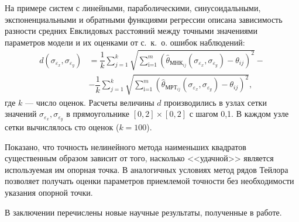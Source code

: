 На примере систем с линейными, параболическими, синусоидальными, экспоненциальными и
обратными функциями регрессии описана зависимость разности
средних Евклидовых расстояний между точными значениями параметров модели и их оценками
от с.~к.~о. ошибок наблюдений:
\begin{equation*}
  \begin{split}
    d(\sigma_{\varepsilon_x}, \sigma_{\varepsilon_y}) &=
    \dfrac{1}{k} \sum_{j=1}^k
    \sqrt{\sum_{\text{i=1}}^m (\hat{\theta}_{\text{МНК}_{ij}}(\sigma_{\varepsilon_x}, \sigma_{\varepsilon_y}) - \theta_{ij})^2} - \\
    &- \dfrac{1}{k} \sum_{j=1}^k
    \sqrt{\sum_{\text{i=1}}^m (\hat{\theta}_{\text{МРТ}_{ij}}(\sigma_{\varepsilon_x}, \sigma_{\varepsilon_y}) - \theta_{ij})^2},
  \end{split}
\end{equation*}
где \( k \) --- число оценок.
Расчеты величины \( d \) производились в узлах сетки значений
\( \sigma_{\varepsilon_x}, \sigma_{\varepsilon_y} \) в прямоугольнике
\( [0, 2] \times [0, 2] \) с шагом 0{,}1.
В каждом узле сетки вычислялось сто оценок (\( k = 100 \)).

Показано, что точность нелинейного метода наименьших квадратов существенным образом
зависит от того, насколько <<удачной>> является используемая им опорная точка.
В аналогичных условиях метод рядов Тейлора позволяет получать оценки параметров
приемлемой точности без необходимости указания опорной точки.

В заключении перечислены новые научные результаты, полученные в работе.
